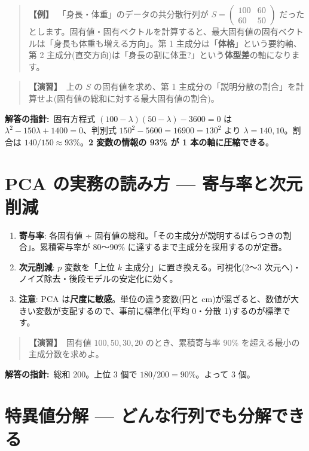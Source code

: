 \documentclass{article}
\begin{document}
\begin{quote}
\textbf{【例】}\ 「身長・体重」のデータの共分散行列が \(S = \begin{pmatrix} 100 & 60 \\ 60 & 50 \end{pmatrix}\) だったとします。固有値・固有ベクトルを計算すると、最大固有値の固有ベクトルは「身長も体重も増える方向」。第 1 主成分は「\textbf{体格}」という要約軸、第 2 主成分(直交方向)は「身長の割に体重?」という\textbf{体型差}の軸になります。
\end{quote}

\begin{quote}
\textbf{【演習】}\ 上の \(S\) の固有値を求め、第 1 主成分の「説明分散の割合」を計算せよ(固有値の総和に対する最大固有値の割合)。
\end{quote}

\textbf{解答の指針:}\ 固有方程式 \((100-\lambda)(50-\lambda) - 3600 = 0\) は \(\lambda^2 - 150\lambda + 1400 = 0\)、判別式 \(150^2 - 5600 = 16900 = 130^2\) より \(\lambda = 140, 10\)。割合は \(140/150 \approx 93\%\)。\textbf{2 変数の情報の 93\% が 1 本の軸に圧縮できる}。

\section{PCA の実務の読み方 — 寄与率と次元削減}

\begin{enumerate}
\item \textbf{寄与率}: 各固有値 ÷ 固有値の総和。「その主成分が説明するばらつきの割合」。累積寄与率が 80〜90\% に達するまで主成分を採用するのが定番。
\item \textbf{次元削減}: \(p\) 変数を「上位 \(k\) 主成分」に置き換える。可視化(2〜3 次元へ)・ノイズ除去・後段モデルの安定化に効く。
\item \textbf{注意}: PCA は\textbf{尺度に敏感}。単位の違う変数(円と cm)が混ざると、数値が大きい変数が支配するので、事前に標準化(平均 0・分散 1)するのが標準です。
\end{enumerate}

\begin{quote}
\textbf{【演習】}\ 固有値 \(100, 50, 30, 20\) のとき、累積寄与率 90\% を超える最小の主成分数を求めよ。
\end{quote}

\textbf{解答の指針:}\ 総和 200。上位 3 個で \(180/200 = 90\%\)。よって 3 個。

\section{特異値分解 — どんな行列でも分解できる}
\end{document}
